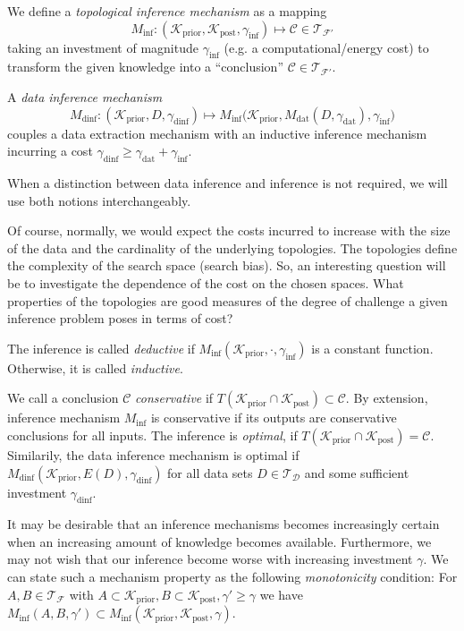 We define a \textit{topological inference mechanism} as a mapping \[ M_{\text{inf}}: (\mathcal K_{\text{prior}}, \mathcal K_{\text{post}}, \gamma_{\text{inf}}) \mapsto  \mathcal C \in \mathcal T_{\mathcal F'}\] taking an investment of magnitude $\gamma_{\text{inf}}$ (e.g. a computational/energy cost) to transform the given knowledge into a ``conclusion'' $\mathcal C \in \mathcal T_{\mathcal F'}$.

A \textit{data inference mechanism} \[M_{\text{dinf}} : (\mathcal K_{\text{prior}}, D,\gamma_{\text{dinf}}) \mapsto M_{\text{inf}} \bigl(\mathcal K_{\text{prior}},M_{\text{dat}}(D,\gamma_{\text{dat}}),\gamma_{\text{inf}} \bigr)\] couples a data extraction mechanism with an inductive inference mechanism incurring a cost $\gamma_{\text{dinf}} \geq \gamma_{\text{dat}} + \gamma_{\text{inf}}$.

When a distinction between data inference and inference is not required, we will use both notions interchangeably.

\begin{rem}
Of course, normally, we would expect the costs incurred to increase with the size of the data and the cardinality of the underlying topologies. The topologies define the complexity of the search space (search bias). So, an interesting question will be to investigate the dependence of the cost on the chosen spaces. What properties of the topologies are good measures of the degree of challenge a given inference problem poses in terms of cost?
\end{rem}

The inference is called \textit{deductive} if $M_{\text{inf}} (\mathcal K_{\text{prior}},\cdot,\gamma_{\text{inf}})$ is a constant function. Otherwise, it is called \textit{inductive}.

We call a conclusion $\mathcal C$  \textit{conservative} if $T(\mathcal K_{\text{prior}} \cap \mathcal K_{\text{post}}) \subset  \mathcal C$.
By extension, inference mechanism $M_{\text{inf}}$ is conservative if its outputs are conservative conclusions for all inputs.
The inference is \textit{optimal}, if $T(\mathcal K_{\text{prior}} \cap \mathcal K_{\text{post}}) =  \mathcal C$.
Similarily, the data inference mechanism is optimal if $M_{\text{dinf}} (\mathcal K_{\text{prior}}, E(D),\gamma_{\text{dinf}})$ for all data sets $D \in \mathcal T_{\mathcal D}$ and some sufficient investment $\gamma_{\text{dinf}}$.


It may be desirable that an inference mechanisms becomes increasingly certain when an increasing amount of knowledge becomes available. Furthermore, we may not wish that our inference become worse with increasing investment $\gamma$. We can state such a mechanism property as the following \textit{monotonicity} condition:
For $A,B \in \mathcal T_{\mathcal F}$ with $A \subset \mathcal K_{\text{prior}},B \subset \mathcal K_{\text{post}}, \gamma' \geq \gamma$ we have $M_{\text{inf}} (A,B,\gamma') \subset M_{\text{inf}} (\mathcal K_{\text{prior}},\mathcal K_{\text{post}},\gamma)$.

